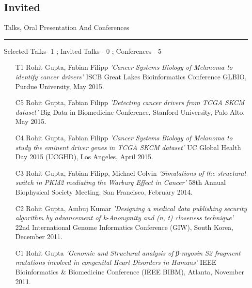 \documentclass[line,margin]{cv_type2}
\begin{document}
\begin{resume}
\section{Invited}\hskip 50pt {\large \sc Talks, }{\large \sc Oral }{\large \sc Presentation} {\large \sc And} {\large \sc Conferences}  \hskip 4pt {\color {gray} \hfill \rule {6cm} {0.1pt}}
\begin{itemize}
{\color{gray} {\small{{Selected Talks- 1 ;} \hskip 10pt {Invited Talks - 0 ;} \hskip 10pt {Conferences - 5}}}}
\end{itemize}
                    \begin{itemize}
                        \item[T1]
                        {Rohit Gupta, Fabian Filipp {\it{'Cancer Systems Biology of Melanoma to identify cancer drivers'}} ISCB Great Lakes Bioinformatics Conference {\small{GLBIO}}, Purdue University, May 2015.}
                    \vskip 2pt
                        \item[C5]
                        {Rohit Gupta, Fabian Filipp {\it{'Detecting cancer drivers from TCGA SKCM dataset'}} Big Data in Biomedicine Conference, Stanford University, Palo Alto, May 2015.}
                    \vskip 2pt
                        \item[C4]
                        {Rohit Gupta, Fabian Filipp {\it{'Cancer Systems Biology of Melanoma to study the eminent driver genes in TCGA SKCM dataset'}} UC Global Health Day 2015 {\small{(UCGHD)}}, Los Angeles, April 2015.}
                    \vskip 2pt
                        \item[C3]
                        {Rohit Gupta, Fabian Filipp, Michael Colvin {\it{'Simulations of the structural switch in PKM2 mediating the Warburg Effect in Cancer'}} 58th Annual Biophysical Society Meeting, San Francisco, February 2014.}
                    \vskip 2pt
                        \item[C2]
                        {Rohit Gupta, Ambuj Kumar {\it{'Designing a medical data publishing security algorithm by advancement of k-Anonymity and (n, t) closeness technique'}} 22nd International Genome Informatics Conference {\small{(GIW)}}, South Korea, December 2011.}
                    \vskip 2pt
                        \item[C1]
                        {Rohit Gupta {\it{'Genomic and Structural analysis of β-myosin S2 fragment mutations involved in congenital Heart Disorders in Humans'}} IEEE Bioinformatics & Biomedicine Conference {\small{(IEEE BIBM)}}, Atlanta, November 2011.}
                    \end{itemize}


\end{resume}
\end{document}
